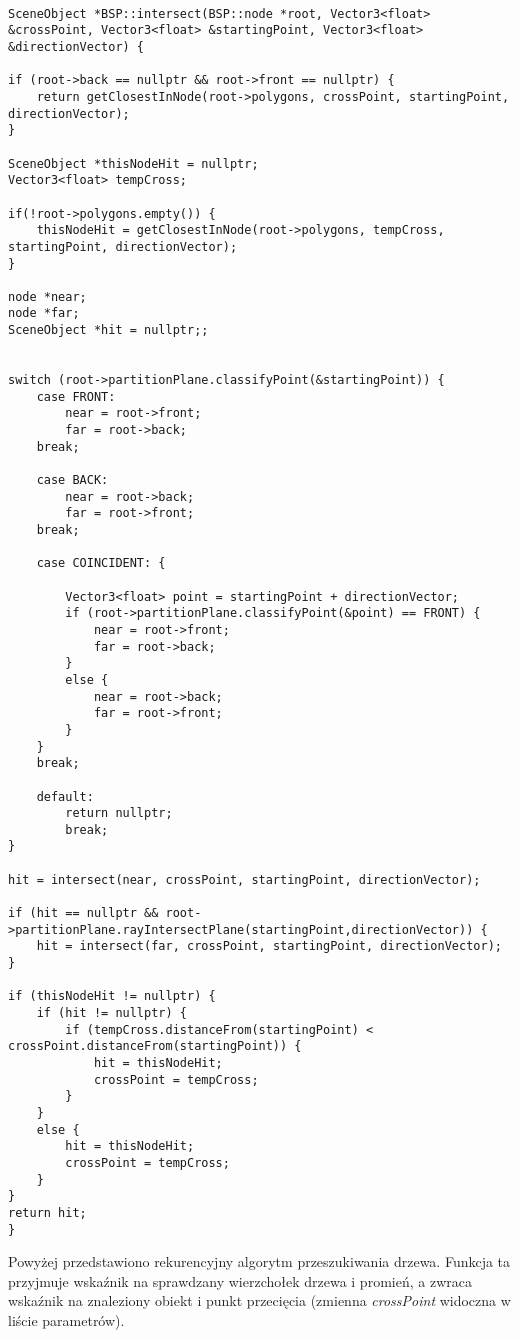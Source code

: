 \begin{lstlisting}[caption={Fragment klasy \emph{BSP} - przeglądanie drzewa}]

SceneObject *BSP::intersect(BSP::node *root, Vector3<float> &crossPoint, Vector3<float> &startingPoint, Vector3<float> &directionVector) {

if (root->back == nullptr && root->front == nullptr) {
    return getClosestInNode(root->polygons, crossPoint, startingPoint, directionVector);
}

SceneObject *thisNodeHit = nullptr;
Vector3<float> tempCross;

if(!root->polygons.empty()) {
    thisNodeHit = getClosestInNode(root->polygons, tempCross, startingPoint, directionVector);
}

node *near;
node *far;
SceneObject *hit = nullptr;;


switch (root->partitionPlane.classifyPoint(&startingPoint)) {
    case FRONT:
        near = root->front;
        far = root->back;
    break;

    case BACK:
        near = root->back;
        far = root->front;
    break;

    case COINCIDENT: {

        Vector3<float> point = startingPoint + directionVector;
        if (root->partitionPlane.classifyPoint(&point) == FRONT) {
            near = root->front;
            far = root->back;
        }
        else {
            near = root->back;
            far = root->front;
        }
    }
    break;

    default:
        return nullptr;
        break;
}

hit = intersect(near, crossPoint, startingPoint, directionVector);

if (hit == nullptr && root->partitionPlane.rayIntersectPlane(startingPoint,directionVector)) {
    hit = intersect(far, crossPoint, startingPoint, directionVector);
}

if (thisNodeHit != nullptr) {
    if (hit != nullptr) {
        if (tempCross.distanceFrom(startingPoint) < crossPoint.distanceFrom(startingPoint)) {
            hit = thisNodeHit;
            crossPoint = tempCross;
        }
    }
    else {
        hit = thisNodeHit;
        crossPoint = tempCross;
    }
}
return hit;
}

\end{lstlisting}

Powyżej przedstawiono rekurencyjny algorytm przeszukiwania drzewa. Funkcja ta przyjmuje wskaźnik na sprawdzany wierzchołek drzewa i promień, a zwraca wskaźnik na znaleziony obiekt i punkt przecięcia (zmienna \emph{crossPoint} widoczna w liście parametrów).

